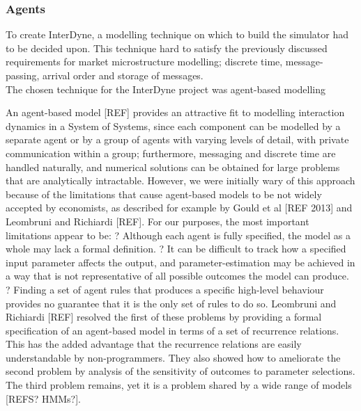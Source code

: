 \documentclass{article}
\begin{document}
\subsubsection{Agents}





To create InterDyne, a modelling technique on which to build the simulator had to be decided upon. This technique hard to satisfy the previously discussed requirements for market microstructure modelling; discrete time, message-passing, arrival order and storage of messages.\\
The chosen technique for the InterDyne project was agent-based modelling \cite{abm1}



An agent-based model [REF] provides an attractive fit to modelling interaction dynamics in a System of Systems, since each component can be modelled by a separate agent or by a group of agents with varying levels of detail, with private communication within a group; furthermore, messaging and discrete time are handled naturally, and numerical solutions can be obtained for large problems that are analytically intractable.  However, we were initially wary of this approach because of the limitations that cause agent-based models to be not widely accepted by economists, as described for example by Gould et al [REF 2013] and Leombruni and Richiardi [REF].  For our purposes, the most important limitations appear to be:
?	Although each agent is fully specified, the model as a whole may lack a formal definition.
?	It can be difficult to track how a specified input parameter affects the output, and parameter-estimation may be achieved in a way that is not representative of all possible outcomes the model can produce. 
?	Finding a set of agent rules that produces a specific high-level behaviour provides no guarantee that it is the only set of rules to do so.
Leombruni and Richiardi [REF] resolved the first of these problems by providing a formal specification of an agent-based model in terms of a set of recurrence relations. This has the added advantage that the recurrence relations are easily understandable by non-programmers.  They also showed how to ameliorate the second problem by analysis of the sensitivity of outcomes to parameter selections.  The third problem remains, yet it is a problem shared by a wide range of models [REFS? HMMs?].
\end{document}
